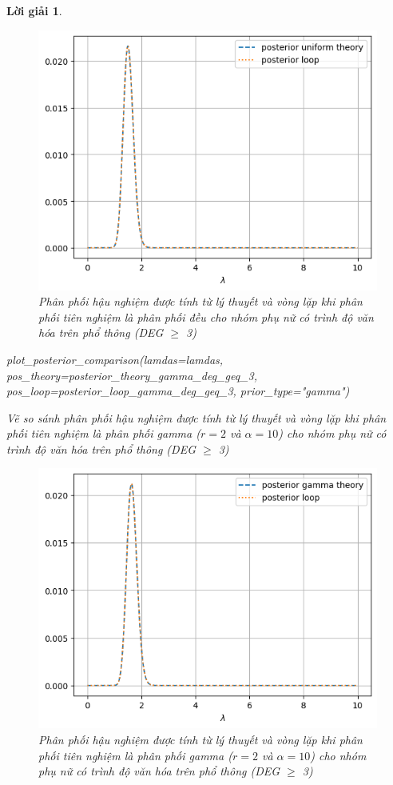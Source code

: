 \documentclass[14pt, a4paper]{article}
\theoremstyle{sltheorem}
\theoremstyle{soltheorem}
\newtheorem*{loigiai}{Lời giải}
\begin{document}
\begin{loigiai}
\begin{enumerate}
        \begin{figure}[h!]
            \centering
            \includegraphics[width=0.6\linewidth]{figures/posterior_loop_theory_uniform_deg_geq_3.png}
            \caption{Phân phối hậu nghiệm được tính từ lý thuyết và vòng lặp khi phân phối tiên nghiệm là phân phối đều cho nhóm phụ nữ có trình độ văn hóa trên phổ thông (DEG $\geq$ 3)}
            \label{fig:posterior_loop_theory_uniform_deg_geq_3}
        \end{figure}

        \begin{python}
plot_posterior_comparison(lamdas=lamdas, pos_theory=posterior_theory_gamma_deg_geq_3, pos_loop=posterior_loop_gamma_deg_geq_3, prior_type="gamma")
        \end{python}

        Vẽ so sánh phân phối hậu nghiệm được tính từ lý thuyết và vòng lặp khi phân phối tiên nghiệm là phân phối gamma ($r=2$ và $\alpha=10$) cho nhóm phụ nữ có trình độ văn hóa trên phổ thông (DEG $\geq$ 3)

        \begin{figure}[h!]
            \centering
            \includegraphics[width=0.6\linewidth]{figures/posterior_loop_theory_gamma_deg_geq_3.png}
            \caption{Phân phối hậu nghiệm được tính từ lý thuyết và vòng lặp khi phân phối tiên nghiệm là phân phối gamma ($r=2$ và $\alpha=10$) cho nhóm phụ nữ có trình độ văn hóa trên phổ thông (DEG $\geq$ 3)}
            \label{fig:posterior_loop_theory_gamma_deg_geq_3}
        \end{figure}


\end{enumerate}
\end{loigiai}
\end{document}

